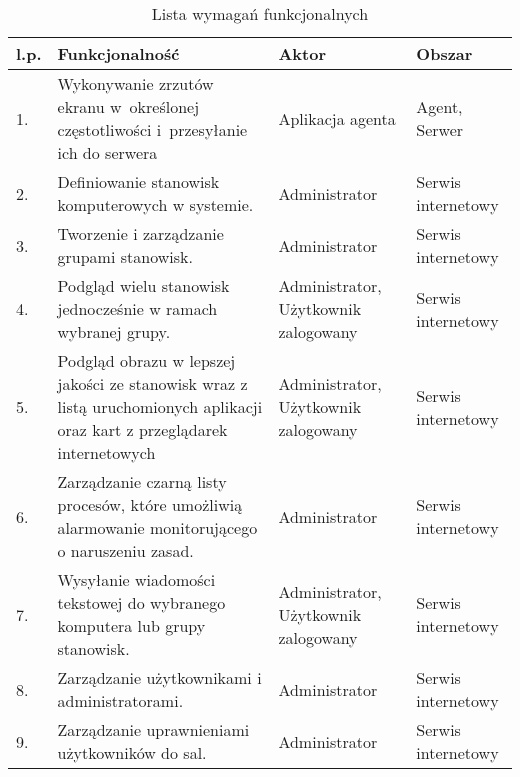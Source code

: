 \begin{table}[!ht]
\caption{Lista wymagań funkcjonalnych}
\label{tab:functionalreq}
\begin{tabular}{| m{0.5cm} | m{7cm} | m{3cm} | m{2cm} |}
\hline
l.p. 
    & Funkcjonalność 
    & Aktor 
    & Obszar 
\\ \hline
    1.   
    & Wykonywanie zrzutów ekranu w~określonej częstotliwości i~przesyłanie ich do serwera
    & Aplikacja agenta
    & Agent, Serwer
\\ \hline
    2. 
    & Definiowanie stanowisk komputerowych w systemie.
    & Administrator
    & Serwis internetowy
\\ \hline
    3.
    & Tworzenie i zarządzanie grupami stanowisk.
    & Administrator
    & Serwis internetowy
\\ \hline
    4. 
    & Podgląd wielu stanowisk jednocześnie w ramach wybranej grupy.
    & Administrator, Użytkownik zalogowany
    & Serwis internetowy
\\ \hline
    5. 
    & Podgląd obrazu w lepszej jakości ze stanowisk wraz z listą uruchomionych aplikacji oraz kart z przeglądarek internetowych
    & Administrator, Użytkownik zalogowany
    & Serwis internetowy
\\ \hline
    6.
    & Zarządzanie czarną listy procesów, które umożliwią alarmowanie monitorującego o naruszeniu zasad.
    & Administrator
    & Serwis internetowy
\\ \hline
    7.
    & Wysyłanie wiadomości tekstowej do wybranego komputera lub grupy stanowisk.
    & Administrator, Użytkownik zalogowany
    & Serwis internetowy
\\ \hline
    8.
    & Zarządzanie użytkownikami i administratorami.
    & Administrator
    & Serwis internetowy
\\ \hline
    9.
    & Zarządzanie uprawnieniami użytkowników do sal.
    & Administrator
    & Serwis internetowy
\\ \hline
    
\end{tabular}
\end{table}


